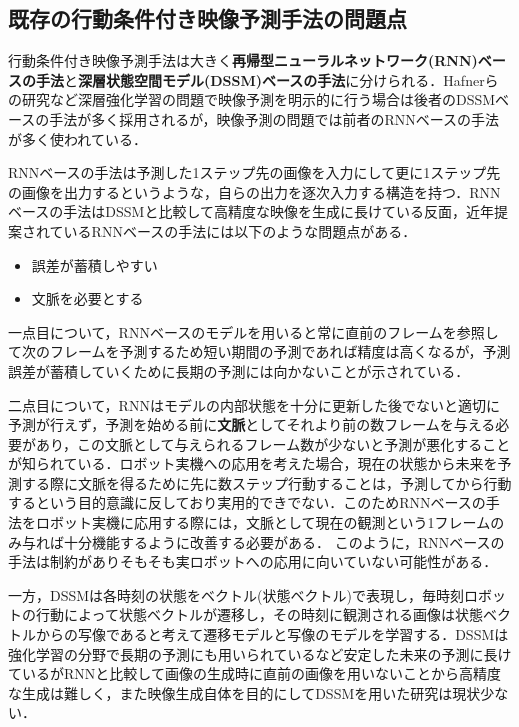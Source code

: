 \subsection{既存の行動条件付き映像予測手法の問題点}

行動条件付き映像予測手法は大きく{\bf 再帰型ニューラルネットワーク(RNN)ベースの手法}と{\bf 深層状態空間モデル(DSSM)ベースの手法}に分けられる．Hafnerら\cite{hafner2019planet}の研究など深層強化学習の問題で映像予測を明示的に行う場合は後者のDSSMベースの手法が多く採用されるが，映像予測の問題では前者のRNNベースの手法が多く使われている\cite{denton2018stochastic}\cite{villegas2019high}．

RNNベースの手法は予測した1ステップ先の画像を入力にして更に1ステップ先の画像を出力するというような，自らの出力を逐次入力する構造を持つ．RNNベースの手法はDSSMと比較して高精度な映像を生成に長けている反面，近年提案されているRNNベースの手法には以下のような問題点がある．

\begin{itemize}
    \item 誤差が蓄積しやすい
    \item 文脈を必要とする
\end{itemize}

一点目について，RNNベースのモデルを用いると常に直前のフレームを参照して次のフレームを予測するため短い期間の予測であれば精度は高くなるが，予測誤差が蓄積していくために長期の予測には向かないことが示されている\cite{hafner2019planet}．

二点目について，RNNはモデルの内部状態を十分に更新した後でないと適切に予測が行えず，予測を始める前に{\bf 文脈}としてそれより前の数フレームを与える必要があり，この文脈として与えられるフレーム数が少ないと予測が悪化することが知られている\cite{villegas2019high}．ロボット実機への応用を考えた場合，現在の状態から未来を予測する際に文脈を得るために先に数ステップ行動することは，予測してから行動するという目的意識に反しており実用的できでない．このためRNNベースの手法をロボット実機に応用する際には，文脈として現在の観測という1フレームのみ与れば十分機能するように改善する必要がある．
このように，RNNベースの手法は制約がありそもそも実ロボットへの応用に向いていない可能性がある．

一方，DSSMは各時刻の状態をベクトル(状態ベクトル)で表現し，毎時刻ロボットの行動によって状態ベクトルが遷移し，その時刻に観測される画像は状態ベクトルからの写像であると考えて遷移モデルと写像のモデルを学習する．DSSMは強化学習の分野で長期の予測にも用いられているなど安定した未来の予測に長けているがRNNと比較して画像の生成時に直前の画像を用いないことから高精度な生成は難しく，また映像生成自体を目的にしてDSSMを用いた研究は現状少ない．

